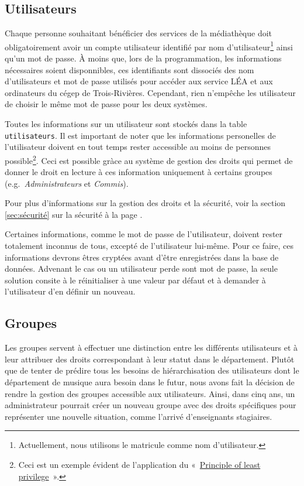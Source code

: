 \documentclass[letter, 11pt]{report}
\begin{document}
\subsection{Utilisateurs}
Chaque personne souhaitant bénéficier des services de la médiathèque doit obligatoirement avoir un compte utilisateur identifié par nom d'utilisateur\footnote{Actuellement, nous utilisons le matricule comme nom d'utilisateur.} ainsi qu'un mot de passe. À moins que, lors de la programmation, les informations nécessaires soient disponnibles, ces identifiants sont dissociés des nom d'utilisateurs et mot de passe utilisés pour accéder aux service LÉA et aux ordinateurs du cégep de Trois-Rivières. Cependant, rien n'empêche les utilisateur de choisir le même mot de passe pour les deux systèmes.

Toutes les informations sur un utilisateur sont stockés dans la table \texttt{utilisateurs}. Il est important de noter que les informations personelles de l'utilisateur doivent en tout temps rester accessible au moins de personnes possible\footnote{Ceci est un exemple évident de l'application du «~\href{http://en.wikipedia.org/wiki/Principle_of_least_privilege}{Principle of least privilege}~».}. Ceci est possible gràce au système de gestion des droits qui permet de donner le droit en lecture à ces information uniquement à certains groupes (e.g.\ \emph{Administrateurs} et \emph{Commis}).

Pour plus d'informations sur la gestion des droits et la sécurité, voir la section \ref{sec:sécurité} sur la sécurité à la page \pageref{sec:sécurité}.

Certaines informations, comme le mot de passe de l'utilisateur, doivent rester totalement inconnus de tous, excepté de l'utilisateur lui-même. Pour ce faire, ces informations devrons êtres cryptées avant d'être enregistrées dans la base de données. Advenant le cas ou un utilisateur perde sont mot de passe, la seule solution consite à le réinitialiser à une valeur par défaut et à demander à l'utilisateur d'en définir un nouveau.

\subsection{Groupes}
Les groupes servent à effectuer une distinction entre les différents utilisateurs et à leur attribuer des droits correspondant à leur statut dans le département. Plutôt que de tenter de prédire tous les besoins de hiérarchisation des utilisateurs dont le département de musique aura besoin dans le futur, nous avons fait la décision de rendre la gestion des groupes accessible aux utilisateurs. Ainsi, dans cinq ans, un administrateur pourrait créer un nouveau groupe avec des droits spécifiques pour représenter une nouvelle situation, comme l'arrivé d'enseignants stagiaires.
\end{document}
